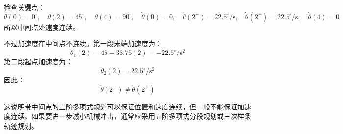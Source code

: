 {检查关键点：
$$
\theta(0)=0^\circ,\quad \theta(2)=45^\circ,\quad \theta(4)=90^\circ,\quad \dot{\theta}(0)=0,\quad \dot{\theta}(2^-)=22.5^\circ/\mathrm{s},\quad \dot{\theta}(2^+)=22.5^\circ/\mathrm{s},\quad \dot{\theta}(4)=0
$$
所以中间点处速度连续。

不过加速度在中间点不连续。第一段末端加速度为：
$$
\ddot{\theta}_1(2)=45-33.75(2)=-22.5^\circ/\mathrm{s}^2
$$
第二段起点加速度为：
$$
\ddot{\theta}_2(2)=22.5^\circ/\mathrm{s}^2
$$
因此：
$$
\ddot{\theta}(2^-)\neq \ddot{\theta}(2^+)
$$

这说明带中间点的三阶多项式规划可以保证位置和速度连续，但一般不能保证加速度连续。如果要进一步减小机械冲击，通常应采用五阶多项式分段规划或三次样条轨迹规划。

}
